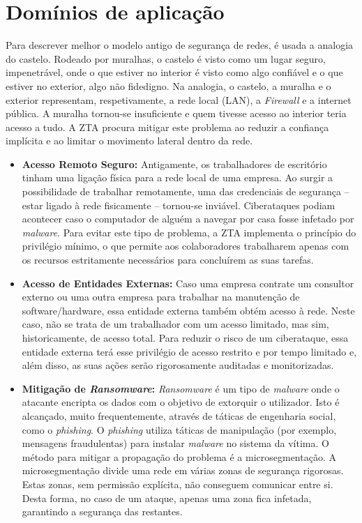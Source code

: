 \documentclass{llncs}
\begin{document}
\section{Domínios de aplicação}
Para descrever melhor o modelo antigo de segurança de redes, é usada a analogia do castelo. Rodeado por muralhas, o castelo é visto como um lugar seguro, impenetrável, onde o que estiver no interior é visto como algo confiável e o que estiver no exterior, algo não fidedigno. Na analogia, o castelo, a muralha e o exterior representam, respetivamente, a rede local (LAN), a \textit{Firewall} e a internet pública. A muralha tornou-se insuficiente e quem tivesse acesso ao interior teria acesso a tudo. A ZTA procura mitigar este problema ao reduzir a confiança implícita e ao limitar o movimento lateral dentro da rede.
\begin{itemize}
    \item \textbf{Acesso Remoto Seguro:} Antigamente, os trabalhadores de escritório tinham uma ligação física para a rede local de uma empresa. Ao surgir a possibilidade de trabalhar remotamente, uma das credenciais de segurança -- estar ligado à rede fisicamente -- tornou-se inviável. Ciberataques podiam acontecer caso o computador de alguém a navegar por casa fosse infetado por \textit{malware}. Para evitar este tipo de problema, a ZTA implementa o princípio do privilégio mínimo, o que permite aos colaboradores trabalharem apenas com os recursos estritamente necessários para concluírem as suas tarefas.  
    
    \item \textbf{Acesso de Entidades Externas:} Caso uma empresa contrate um consultor externo ou uma outra empresa para trabalhar na manutenção de software/hardware, essa entidade externa também obtém acesso à rede. Neste caso, não se trata de um trabalhador com um acesso limitado, mas sim, historicamente, de acesso total. Para reduzir o risco de um ciberataque, essa entidade externa terá esse privilégio de acesso restrito e por tempo limitado e, além disso, as suas ações serão rigorosamente auditadas e monitorizadas.

    \item \textbf{Mitigação de \textit{Ransomware}:} \textit{Ransomware} é um tipo de \textit{malware} onde o atacante encripta os dados com o objetivo de extorquir o utilizador. Isto é alcançado, muito frequentemente, através de táticas de engenharia social, como o \textit{phishing}. O \textit{phishing} utiliza táticas de manipulação (por exemplo, mensagens fraudulentas) para instalar \textit{malware} no sistema da vítima. O método para mitigar a propagação do problema é a microsegmentação. A microsegmentação divide uma rede em várias zonas de segurança rigorosas. Estas zonas, sem permissão explícita, não conseguem comunicar entre si. Desta forma, no caso de um ataque, apenas uma zona fica infetada, garantindo a segurança das restantes.
\end{itemize}
\end{document}
